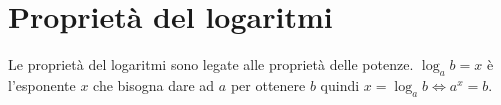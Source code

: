 \section{Proprietà del logaritmi}
Le proprietà del logaritmi sono legate alle proprietà delle potenze. $\log_ab=x$ è l'esponente $x$ che bisogna dare ad $a$ per ottenere $b$ quindi $x=\log_ab\Leftrightarrow a^{x}=b$. 
\label{sec:ProprietadelLogaritmi}
